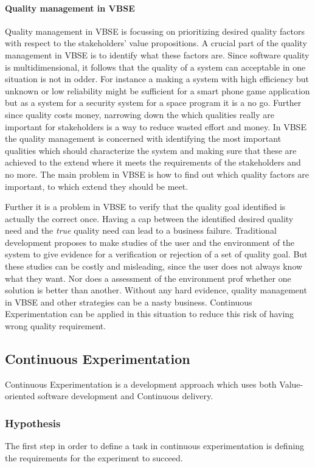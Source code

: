 \documentclass{sig-alternate}
\begin{document}
\paragraph{Quality management in VBSE}
Quality management in VBSE is focussing on prioritizing desired quality factors with respect to the stakeholders' value propositions. A crucial part of the quality management in VBSE is to identify what these factors are. Since software quality is multidimensional, it follows that the quality of a system can acceptable in one situation is not in odder. For instance a making a system with high efficiency but unknown or low reliability might be sufficient for a smart phone game application but as a system for a security system for a space program it is a no go. Further since quality costs money, narrowing down the which qualities really are important for stakeholders is a way to reduce wasted effort and money. In VBSE the quality management is concerned with identifying the most important qualities which should characterize the system and making sure that these are achieved to the extend where it meets the requirements of the stakeholders and no more. 
The main problem in VBSE is how to find out which quality factors are important, to which extend they should be meet. 

Further it is a problem in VBSE to verify that the quality goal identified is actually the correct once. Having a cap between the identified desired quality need and the \textit{true} quality need can lead to a business failure. 
Traditional development proposes to make studies of the user and the environment of the system to give evidence for a verification or rejection of a set of quality goal. But these studies can be costly and misleading, since the user does not always know what they want. Nor does a assessment of the environment prof whether one solution is better than another. Without any hard evidence, quality management in VBSE and other strategies can be a nasty business. Continuous Experimentation can be applied in this situation to reduce this risk of having wrong quality requirement. 

\subsection{Continuous Experimentation}
Continuous Experimentation is a development approach which uses both Value-oriented software development and Continuous delivery. 

\subsubsection{Hypothesis}
The first step in order to define a task in continuous experimentation is defining the requirements for the experiment to succeed. 
\end{document}

